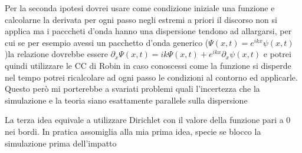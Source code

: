 Per la seconda ipotesi dovrei usare come condizione iniziale una funzione e calcolarne la derivata per ogni passo negli estremi a priori il discorso non si applica ma i pacccheti d'onda hanno una dispersione tendono ad allargarsi, per cui se  per esempio avessi un pacchetto d'onda generico ($\Psi(x,t) = e^{ikx} \psi(x,t)$)la relazione dovrebbe essere $\partial_x \Psi(x,t) = ik \Psi(x,t) + e^{ikx}\partial_x\psi(x,t)$ e potrei quindi utilizzare le CC di Robin in caso conoscessi come la funzione si disperde nel tempo potrei ricalcolare ad ogni passo le condizioni al contorno ed applicarle. Questo per\`o mi porterebbe a svariati problemi quali l'incertezza che la simulazione e la teoria siano esattamente parallele sulla dispersione 

La terza idea equivale a utilizzare Dirichlet con il valore della funzione pari a 0 nei bordi. In pratica assomiglia alla mia prima idea, specie se blocco la simulazione prima dell'impatto


